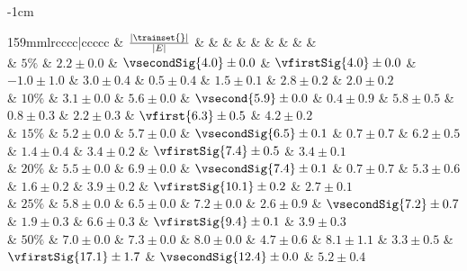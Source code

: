 \begin{table}[tbh]
\begin{adjustwidth}{-1cm}{}
\centering
\setlength{\tabcolsep}{3pt}
\scriptsize
\caption{%
Same as \autoref{tab:all_mcc}, but when selecting the training set by the timestamp of the edges.
\label{tab:troll_ts_mcc}}
\begin{tabulary}{159mm}{lrcccc|ccccc}
\toprule
& $\frac{|\trainset{}|}{|E|}$ &               \uslpropGsec{} &                    \usrule{} &                 \uslogregp{} &       \usoptim{} &               \complowrank{} &  \compmaxnorm{} &                 \comptriads{} &              \compranknodes{} &  \compbayesian{} \\
\midrule
{} & $5\%$  &               $2.2 \pm 0.0$  &  $\vsecondSig{4.0} \pm 0.0$  &   $\vfirstSig{4.0} \pm 0.0$  &  $-1.0 \pm 1.0$  &               $3.0 \pm 0.4$  &  $0.5 \pm 0.4$  &                $1.5 \pm 0.1$  &                $2.8 \pm 0.2$  &   $2.0 \pm 0.2$  \\
                                                  & $10\%$ &               $3.1 \pm 0.0$  &               $5.6 \pm 0.0$  &     $\vsecond{5.9} \pm 0.0$  &   $0.4 \pm 0.9$  &               $5.8 \pm 0.5$  &  $0.8 \pm 0.3$  &                $2.2 \pm 0.3$  &       $\vfirst{6.3} \pm 0.5$  &   $4.2 \pm 0.2$  \\
                                                  & $15\%$ &               $5.2 \pm 0.0$  &               $5.7 \pm 0.0$  &  $\vsecondSig{6.5} \pm 0.1$  &   $0.7 \pm 0.7$  &               $6.2 \pm 0.5$  &  $1.4 \pm 0.4$  &                $3.4 \pm 0.2$  &    $\vfirstSig{7.4} \pm 0.5$  &   $3.4 \pm 0.1$  \\
                                                  & $20\%$ &               $5.5 \pm 0.0$  &               $6.9 \pm 0.0$  &  $\vsecondSig{7.4} \pm 0.1$  &   $0.7 \pm 0.7$  &               $5.3 \pm 0.6$  &  $1.6 \pm 0.2$  &                $3.9 \pm 0.2$  &   $\vfirstSig{10.1} \pm 0.2$  &   $2.7 \pm 0.1$  \\
                                                  & $25\%$ &               $5.8 \pm 0.0$  &               $6.5 \pm 0.0$  &               $7.2 \pm 0.0$  &   $2.6 \pm 0.9$  &  $\vsecondSig{7.2} \pm 0.7$  &  $1.9 \pm 0.3$  &                $6.6 \pm 0.3$  &    $\vfirstSig{9.4} \pm 0.1$  &   $3.9 \pm 0.3$  \\
                                                  & $50\%$ &               $7.0 \pm 0.0$  &               $7.3 \pm 0.0$  &               $8.0 \pm 0.0$  &   $4.7 \pm 0.6$  &               $8.1 \pm 1.1$  &  $3.3 \pm 0.5$  &   $\vfirstSig{17.1} \pm 1.7$  &  $\vsecondSig{12.4} \pm 0.0$  &   $5.2 \pm 0.4$  \\

\end{tabulary}
\end{adjustwidth}
\end{table}
